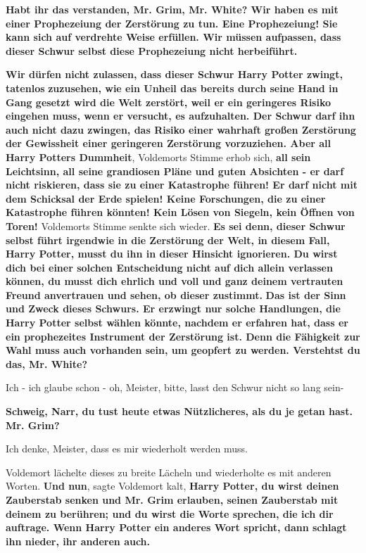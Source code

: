 \textbf{Habt ihr das verstanden, Mr. Grim, Mr. White? Wir haben es mit einer
Prophezeiung der Zerstörung zu tun. Eine Prophezeiung! Sie kann sich auf
verdrehte Weise erfüllen. Wir müssen aufpassen, dass dieser Schwur selbst diese
Prophezeiung nicht herbeiführt.}

\textbf{Wir dürfen nicht zulassen, dass dieser Schwur Harry Potter zwingt,
tatenlos} \textbf{zuzusehen, wie ein Unheil das bereits durch seine Hand in Gang
gesetzt wird die Welt zerstört, weil er ein geringeres Risiko eingehen muss,
wenn er versucht, es aufzuhalten. Der Schwur darf ihn auch nicht dazu zwingen,
das Risiko einer wahrhaft großen Zerstörung der Gewissheit einer geringeren
Zerstörung vorzuziehen. Aber all Harry Potters Dummheit}\grqq{}, Voldemorts
Stimme erhob sich, \glqq{}\textbf{all sein Leichtsinn, all seine grandiosen Pläne
und guten Absichten - er darf nicht riskieren, dass sie zu einer Katastrophe
führen! Er darf nicht mit dem Schicksal der Erde spielen! Keine Forschungen, die
zu einer Katastrophe führen könnten! Kein Lösen von Siegeln, kein Öffnen von
Toren!}\grqq{} Voldemorts Stimme senkte sich wieder. \glqq{}\textbf{Es sei denn,
dieser Schwur selbst führt irgendwie in die Zerstörung der Welt, in diesem Fall,
Harry Potter, musst du ihn in dieser Hinsicht ignorieren. Du wirst dich bei
einer solchen Entscheidung nicht auf dich allein verlassen können, du musst dich
ehrlich und voll und ganz deinem vertrauten Freund anvertrauen und sehen, ob
dieser zustimmt.} \textbf{ Das ist der Sinn und Zweck dieses Schwurs. Er
erzwingt nur solche Handlungen, die Harry Potter selbst wählen könnte, nachdem
er erfahren hat, dass er ein prophezeites Instrument der Zerstörung ist. Denn
die Fähigkeit zur Wahl muss auch vorhanden sein, um geopfert zu werden.
Verstehtst du das, Mr. White?}\grqq{}

\glqq{}Ich - ich glaube schon - oh, Meister, bitte, lasst den Schwur nicht so
lang sein-\grqq{}

\glqq{}\textbf{Schweig, Narr, du tust heute etwas Nützlicheres, als du je getan
hast. Mr. Grim?}\grqq{}

\glqq{}Ich denke, Meister, dass es mir wiederholt werden muss.\grqq{}

Voldemort lächelte dieses zu breite Lächeln und wiederholte es mit anderen
Worten. \glqq{}\textbf{Und nun}\grqq{}, sagte Voldemort kalt, \glqq{}\textbf{Harry
Potter, du wirst deinen Zauberstab senken und Mr. Grim erlauben, seinen
Zauberstab mit deinem zu berühren; und du wirst die Worte sprechen, die ich dir
auftrage. Wenn Harry Potter ein anderes Wort spricht, dann schlagt ihn nieder,
ihr anderen auch.}\grqq{}

